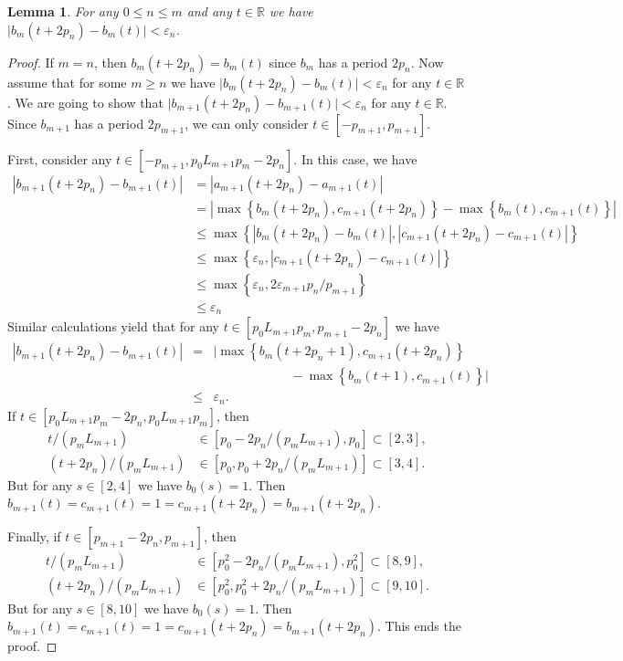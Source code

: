 \documentclass[reqno,a4paper,12pt]{amsart}
\newtheorem{lem}[thm]{Lemma}
\theoremstyle{definition}
\numberwithin{equation}{section}
\begin{document}
\begin{lem}\label{lem:copy_extend}
For any $0\leq n \leq m$ and any $t\in{\mathbb{R}}$ we have $\vert b_m(t+2p_n)-b_m(t)\vert<{\varepsilon}_n$.
\end{lem}
\begin{proof}
If $m=n$, then $b_m(t+2p_n)=b_m(t)$ since $b_m$ has a period $2p_n$.
Now assume that for some $m\geq n$ we have
$\vert b_m(t+2p_n)-b_m(t)\vert<{\varepsilon}_n$ for any $t\in{\mathbb{R}}$.
We are going to show that $\vert b_{m+1}(t+2p_n)-b_{m+1}(t)\vert<{\varepsilon}_n$ for any $t\in{\mathbb{R}}$.
Since $b_{m+1}$ has a period $2p_{m+1}$, we can only consider $t\in[-p_{m+1},p_{m+1}]$.

First, consider any $t\in [-p_{m+1}, p_0L_{m+1} p_m-2p_n]$. In this case, we have
\begin{align*}
|b_{m+1}(t+2p_n)-b_{m+1}(t)| &= |a_{m+1}(t+2p_n)-a_{m+1}(t)|\\
&=|\max{\left\{{b_{m}(t+2p_n),c_{m+1}(t+2p_n)}\right\}}-\max{\left\{{b_{m}(t),c_{m+1}(t)}\right\}}|\\
&\leq  \max {\left\{{|b_{m}(t+2p_n)-b_{m}(t)|, |c_{m+1}(t+2p_n)-c_{m+1}(t)|}\right\}}\\
&\leq  \max{\left\{{{\varepsilon}_n, |c_{m+1}(t+2p_n)-c_{m+1}(t)|}\right\}}\\
&\leq \max{\left\{{{\varepsilon}_n, 2{\varepsilon}_{m+1} p_n / p_{m+1}}\right\}}\\
&\leq  {\varepsilon}_n
\end{align*}
Similar calculations yield that for any $t\in [p_0L_{m+1} p_m, p_{m+1}-2p_n]$ we have
\begin{eqnarray*}
|b_{m+1}(t+2p_n)-b_{m+1}(t)| &=& |\max{\left\{{b_{m}(t+2p_n+1),c_{m+1}(t+2p_n)}\right\}}\\
&&\quad\quad\quad\quad\quad\quad-\max{\left\{{b_{m}(t+1),c_{m+1}(t)}\right\}}|\\
&\leq & {\varepsilon}_n.
\end{eqnarray*}
If $t\in [p_0L_{m+1} p_m-2p_n, p_0L_{m+1} p_m]$, then
\begin{align*}
  t/(p_{m}L_{m+1})&\in [p_0-2p_n/(p_{m}L_{m+1}),p_0]\subset [2,3],\\
  (t+2p_n)/(p_{m}L_{m+1})&\in [p_0,p_0+2p_n/(p_{m}L_{m+1})]\subset [3,4].
\end{align*}
But for any $s\in [2,4]$ we have $b_0(s)=1$.
Then $b_{m+1}(t)=c_{m+1}(t)=1=c_{m+1}(t+2p_n)=b_{m+1}(t+2p_n)$.

Finally, if $t\in [p_{m+1}-2p_n,p_{m+1}]$, then
\begin{align*}
  t/(p_{m}L_{m+1})&\in [p_0^2-2p_n/(p_{m}L_{m+1}),p_0^2]\subset [8,9],\\
  (t+2p_n)/(p_{m}L_{m+1})&\in [p_0^2,p_0^2+2p_n/(p_{m}L_{m+1})]\subset [9,10].
\end{align*}
But for any $s\in [8,10]$ we have $b_0(s)=1$.
Then $b_{m+1}(t)=c_{m+1}(t)=1=c_{m+1}(t+2p_n)=b_{m+1}(t+2p_n)$.
This ends the proof.
\end{proof}
\end{document}
